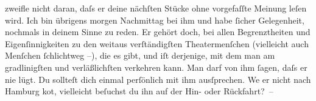                zweifle nicht daran, daſs er deine nächſten Stücke ohne vorgefaſſte Meinung leſen
               wird. Ich bin übrigens mor{\pb}gen Nachmittag bei ihm
               und habe ſicher Gelegenheit, nochmals in deinem Sinne zu reden. Er gehört doch, bei
               allen Begrenztheiten und Eigenſinnigkeiten zu den weitaus verſtändigſten
               Theatermenſchen \introOben{}(vielleicht auch Menſchen ſchlichtweg –)\introOben{},
               die es gibt, und iſt derjenige, mit dem man am gradlinigſten und verläßlichſten
               verkehren kann. Man darf von ihm ſagen, daſs {\pb}er nie lügt. Du
               sollteſt dich einmal perſönlich mit ihm ausſprechen. We{\geminationn}
               er nicht nach Hamburg ko{\geminationm}t, vielleicht beſuchst du ihn auf der Hin- oder
               Rückfahrt? – \pend
           
